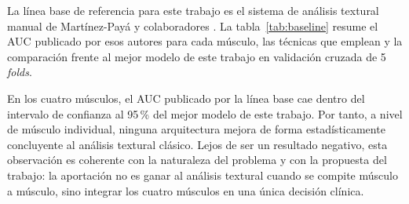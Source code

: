 \documentclass[12pt]{extarticle}
\numberwithin{equation}{section}
\begin{document}
\begin{refsection}
La línea base de referencia para este trabajo es el sistema de análisis textural manual de Martínez-Payá y colaboradores \cite{martinezpaya2017quantitative}. La tabla~\ref{tab:baseline} resume el AUC publicado por esos autores para cada músculo, las técnicas que emplean y la comparación frente al mejor modelo de este trabajo en validación cruzada de 5 \textit{folds}.

\begin{table}[h!]
\centering
\caption{Comparación con la línea base clínica \cite{martinezpaya2017quantitative}. La columna ``Mejor arquitectura'' indica el modelo de mayor AUC en cada músculo, con su IC95\,\% \textit{bootstrap}. La columna ``Veredicto'' resume si el AUC publicado por la línea base cae dentro (equivalente) o fuera (mejora) del IC95\,\%.}
\label{tab:baseline}
\small
{}
\end{table}

En los cuatro músculos, el AUC publicado por la línea base cae dentro del intervalo de confianza al 95\,\% del mejor modelo de este trabajo. Por tanto, a nivel de músculo individual, ninguna arquitectura mejora de forma estadísticamente concluyente al análisis textural clásico. Lejos de ser un resultado negativo, esta observación es coherente con la naturaleza del problema y con la propuesta del trabajo: la aportación no es ganar al análisis textural cuando se compite músculo a músculo, sino integrar los cuatro músculos en una única decisión clínica.


\end{refsection}
\end{document}
